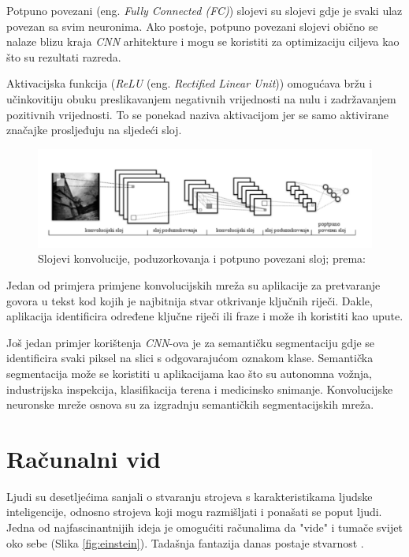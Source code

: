 \documentclass[]{foi} %
\begin{document}
Potpuno povezani (eng. \textit{Fully Connected (FC)}) \cite[str. 89, 90]{fundamentals} slojevi su slojevi gdje je svaki ulaz povezan sa svim neuronima. Ako postoje, potpuno povezani slojevi obično se nalaze blizu kraja \textit{CNN} arhitekture i mogu se koristiti za optimizaciju ciljeva kao što su rezultati razreda.

Aktivacijska funkcija (\textit{ReLU} (eng. \textit{Rectified Linear Unit})) \cite[str. 13-15]{fundamentals} omogućava bržu i učinkovitiju obuku preslikavanjem negativnih vrijednosti na nulu i zadržavanjem pozitivnih vrijednosti. To se ponekad naziva aktivacijom jer se samo aktivirane značajke prosljeđuju na sljedeći sloj.

\begin{figure}[!ht]
    \centering
    \includegraphics[width=1\textwidth]{slike/konvmreza.png}
    \caption{Slojevi konvolucije, poduzorkovanja i potpuno povezani sloj; prema: \cite{konv}}
    \label{fig:konvmreza}
\end{figure}

Jedan od primjera primjene konvolucijskih mreža su aplikacije \cite{primjena} za pretvaranje govora u tekst kod kojih je najbitnija stvar otkrivanje ključnih riječi. Dakle, aplikacija identificira određene ključne riječi ili fraze i može ih koristiti kao upute.

Još jedan primjer \cite{primjena} korištenja \textit{CNN}-ova je za semantičku segmentaciju gdje se identificira svaki piksel na slici s odgovarajućom oznakom klase. Semantička segmentacija može se koristiti u aplikacijama kao što su autonomna vožnja, industrijska inspekcija, klasifikacija terena i medicinsko snimanje. Konvolucijske neuronske mreže osnova su za izgradnju semantičkih segmentacijskih mreža.

\chapter{Računalni vid}

Ljudi su desetljećima sanjali o stvaranju strojeva s karakteristikama ljudske inteligencije, odnosno strojeva koji mogu razmišljati i ponašati se poput ljudi. Jedna od najfascinantnijih ideja je omogućiti računalima da "vide" i tumače svijet oko sebe (Slika \ref{fig:einstein}). Tadašnja fantazija danas postaje stvarnost \cite[str. 3]{szeliskicvaa}.
\end{document}
